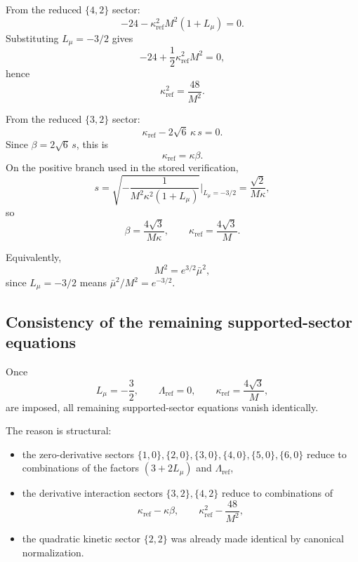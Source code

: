 \documentclass[11pt]{article}
\newcommand{\Lmu}{L_\mu}
\begin{document}
From the reduced $\{4,2\}$ sector:
\begin{equation}
-24-\kappa_{\mathrm{ref}}^2 M^2(1+\Lmu)=0.
\end{equation}
Substituting $\Lmu=-3/2$ gives
\[
-24+\frac12 \kappa_{\mathrm{ref}}^2 M^2=0,
\]
hence
\begin{equation}
\boxed{\kappa_{\mathrm{ref}}^2=\frac{48}{M^2}.}
\end{equation}

From the reduced $\{3,2\}$ sector:
\begin{equation}
\kappa_{\mathrm{ref}}-2\sqrt6\,\kappa\,s=0.
\end{equation}
Since $\beta=2\sqrt6\,s$, this is
\[
\kappa_{\mathrm{ref}}=\kappa\beta.
\]
On the positive branch used in the stored verification,
\[
s=\sqrt{-\frac{1}{M^2\kappa^2(1+\Lmu)}}\Bigg|_{\Lmu=-3/2}
=
\frac{\sqrt2}{M\kappa},
\]
so
\begin{equation}
\boxed{
\beta=\frac{4\sqrt3}{M\kappa},
\qquad
\kappa_{\mathrm{ref}}=\frac{4\sqrt3}{M}.}
\end{equation}

Equivalently,
\begin{equation}
\boxed{M^2=e^{3/2}\bar\mu^2,}
\end{equation}
since $\Lmu=-3/2$ means $\bar\mu^2/M^2=e^{-3/2}$.

\subsection{Consistency of the remaining supported-sector equations}

Once
\[
\Lmu=-\frac32,\qquad
\Lambda_{\mathrm{ref}}=0,\qquad
\kappa_{\mathrm{ref}}=\frac{4\sqrt3}{M},
\]
are imposed, all remaining supported-sector equations vanish identically.

The reason is structural:
\begin{itemize}
\item the zero-derivative sectors $\{1,0\},\{2,0\},\{3,0\},\{4,0\},\{5,0\},\{6,0\}$ reduce to combinations of the factors $(3+2\Lmu)$ and $\Lambda_{\mathrm{ref}}$,
\item the derivative interaction sectors $\{3,2\},\{4,2\}$ reduce to combinations of
\[
\kappa_{\mathrm{ref}}-\kappa\beta,
\qquad
\kappa_{\mathrm{ref}}^2-\frac{48}{M^2},
\]
\item the quadratic kinetic sector $\{2,2\}$ was already made identical by canonical normalization.
\end{itemize}
\end{document}
